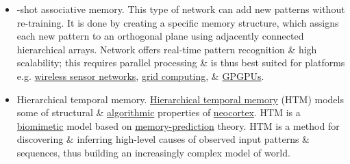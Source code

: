 \documentclass{article}
\begin{document}
\begin{itemize}
	\item {-shot associative memory.} This type of network can add new patterns without re-training. It is done by creating a specific memory structure, which assigns each new pattern to an orthogonal plane using adjacently connected hierarchical arrays. Network offers real-time pattern recognition \& high scalability; this requires parallel processing \& is thus best suited for platforms e.g. \href{https://en.wikipedia.org/wiki/Wireless_sensor_network}{wireless sensor networks}, \href{https://en.wikipedia.org/wiki/Grid_computing}{grid computing}, \& \href{https://en.wikipedia.org/wiki/GPGPU}{GPGPUs}.
	\item {\sf Hierarchical temporal memory.} \href{https://en.wikipedia.org/wiki/Hierarchical_temporal_memory}{Hierarchical temporal memory} (HTM) models some of structural \& \href{https://en.wikipedia.org/wiki/Algorithm}{algorithmic} properties of \href{https://en.wikipedia.org/wiki/Neocortex}{neocortex}. HTM is a \href{https://en.wikipedia.org/wiki/Bionics}{biomimetic} model based on \href{https://en.wikipedia.org/wiki/Memory-prediction_framework}{memory-prediction} theory. HTM is a method for discovering \& inferring high-level causes of observed input patterns \& sequences, thus building an increasingly complex model of world.
	

\end{itemize}
\end{document}
